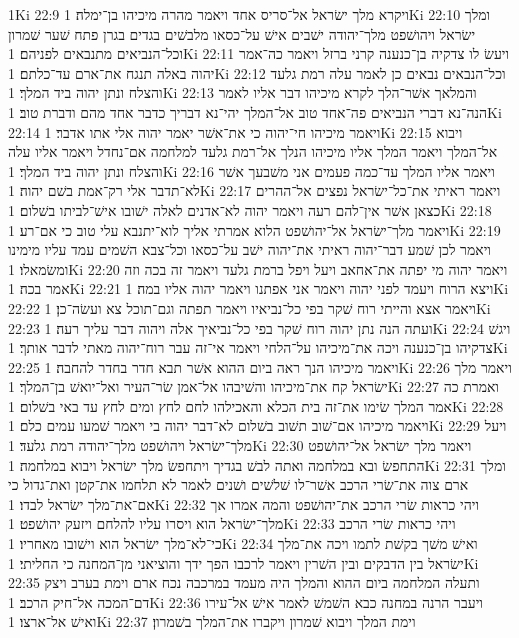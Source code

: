 1Ki 22:9  ויקרא מלך ישׂראל אל־סריס אחד ויאמר מהרה מיכיהו בן־ימלה׃
1Ki 22:10  ומלך ישׂראל ויהושׁפט מלך־יהודה ישׁבים אישׁ על־כסאו מלבשׁים בגדים בגרן פתח שׁער שׁמרון וכל־הנביאים מתנבאים לפניהם׃
1Ki 22:11  ויעשׂ לו צדקיה בן־כנענה קרני ברזל ויאמר כה־אמר יהוה באלה תנגח את־ארם עד־כלתם׃
1Ki 22:12  וכל־הנבאים נבאים כן לאמר עלה רמת גלעד והצלח ונתן יהוה ביד המלך׃
1Ki 22:13  והמלאך אשׁר־הלך לקרא מיכיהו דבר אליו לאמר הנה־נא דברי הנביאים פה־אחד טוב אל־המלך יהי־נא דבריך כדבר אחד מהם ודברת טוב׃
1Ki 22:14  ויאמר מיכיהו חי־יהוה כי את־אשׁר יאמר יהוה אלי אתו אדבר׃
1Ki 22:15  ויבוא אל־המלך ויאמר המלך אליו מיכיהו הנלך אל־רמת גלעד למלחמה אם־נחדל ויאמר אליו עלה והצלח ונתן יהוה ביד המלך׃
1Ki 22:16  ויאמר אליו המלך עד־כמה פעמים אני משׁבעך אשׁר לא־תדבר אלי רק־אמת בשׁם יהוה׃
1Ki 22:17  ויאמר ראיתי את־כל־ישׂראל נפצים אל־ההרים כצאן אשׁר אין־להם רעה ויאמר יהוה לא־אדנים לאלה ישׁובו אישׁ־לביתו בשׁלום׃
1Ki 22:18  ויאמר מלך־ישׂראל אל־יהושׁפט הלוא אמרתי אליך לוא־יתנבא עלי טוב כי אם־רע׃
1Ki 22:19  ויאמר לכן שׁמע דבר־יהוה ראיתי את־יהוה ישׁב על־כסאו וכל־צבא השׁמים עמד עליו מימינו ומשׂמאלו׃
1Ki 22:20  ויאמר יהוה מי יפתה את־אחאב ויעל ויפל ברמת גלעד ויאמר זה בכה וזה אמר בכה׃
1Ki 22:21  ויצא הרוח ויעמד לפני יהוה ויאמר אני אפתנו ויאמר יהוה אליו במה׃
1Ki 22:22  ויאמר אצא והייתי רוח שׁקר בפי כל־נביאיו ויאמר תפתה וגם־תוכל צא ועשׂה־כן׃
1Ki 22:23  ועתה הנה נתן יהוה רוח שׁקר בפי כל־נביאיך אלה ויהוה דבר עליך רעה׃
1Ki 22:24  ויגשׁ צדקיהו בן־כנענה ויכה את־מיכיהו על־הלחי ויאמר אי־זה עבר רוח־יהוה מאתי לדבר אותך׃
1Ki 22:25  ויאמר מיכיהו הנך ראה ביום ההוא אשׁר תבא חדר בחדר להחבה׃
1Ki 22:26  ויאמר מלך ישׂראל קח את־מיכיהו והשׁיבהו אל־אמן שׂר־העיר ואל־יואשׁ בן־המלך׃
1Ki 22:27  ואמרת כה אמר המלך שׂימו את־זה בית הכלא והאכילהו לחם לחץ ומים לחץ עד באי בשׁלום׃
1Ki 22:28  ויאמר מיכיהו אם־שׁוב תשׁוב בשׁלום לא־דבר יהוה בי ויאמר שׁמעו עמים כלם׃
1Ki 22:29  ויעל מלך־ישׂראל ויהושׁפט מלך־יהודה רמת גלעד׃
1Ki 22:30  ויאמר מלך ישׂראל אל־יהושׁפט התחפשׂ ובא במלחמה ואתה לבשׁ בגדיך ויתחפשׂ מלך ישׂראל ויבוא במלחמה׃
1Ki 22:31  ומלך ארם צוה את־שׂרי הרכב אשׁר־לו שׁלשׁים ושׁנים לאמר לא תלחמו את־קטן ואת־גדול כי אם־את־מלך ישׂראל לבדו׃
1Ki 22:32  ויהי כראות שׂרי הרכב את־יהושׁפט והמה אמרו אך מלך־ישׂראל הוא ויסרו עליו להלחם ויזעק יהושׁפט׃
1Ki 22:33  ויהי כראות שׂרי הרכב כי־לא־מלך ישׂראל הוא וישׁובו מאחריו׃
1Ki 22:34  ואישׁ משׁך בקשׁת לתמו ויכה את־מלך ישׂראל בין הדבקים ובין השׁרין ויאמר לרכבו הפך ידך והוציאני מן־המחנה כי החליתי׃
1Ki 22:35  ותעלה המלחמה ביום ההוא והמלך היה מעמד במרכבה נכח ארם וימת בערב ויצק דם־המכה אל־חיק הרכב׃
1Ki 22:36  ויעבר הרנה במחנה כבא השׁמשׁ לאמר אישׁ אל־עירו ואישׁ אל־ארצו׃
1Ki 22:37  וימת המלך ויבוא שׁמרון ויקברו את־המלך בשׁמרון׃
